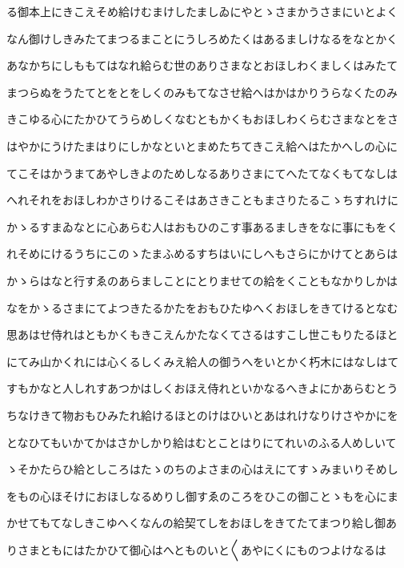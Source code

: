 \documentclass[a4paper,11pt,landscape]{ltjtarticle}
\begin{document}
る御本上にきこえそめ給けむまけしたましゐにやとゝさまかうさまにいとよく
\par\medskip
なん御けしきみたてまつるまことにうしろめたくはあるましけなるをなとかく
\par\medskip
あなかちにしももてはなれ給らむ世のありさまなとおほしわくましくはみたて
\par\medskip
まつらぬをうたてとをとをしくのみもてなさせ給へはかはかりうらなくたのみ
\par\medskip
きこゆる心にたかひてうらめしくなむともかくもおほしわくらむさまなとをさ
\par\medskip
はやかにうけたまはりにしかなといとまめたちてきこえ給へはたかへしの心に
\par\medskip
てこそはかうまてあやしきよのためしなるありさまにてへたてなくもてなしは
\par\medskip
へれそれをおほしわかさりけるこそはあさきこともまさりたるこゝちすれけに
\par\medskip
かゝるすまゐなとに心あらむ人はおもひのこす事あるましきをなに事にもをく
\par\medskip
れそめにけるうちにこのゝたまふめるすちはいにしへもさらにかけてとあらは
\par\medskip
かゝらはなと行すゑのあらましことにとりませての給をくこともなかりしかは
\par\medskip
なをかゝるさまにてよつきたるかたをおもひたゆへくおほしをきてけるとなむ
\par\medskip
思あはせ侍れはともかくもきこえんかたなくてさるはすこし世こもりたるほと
\par\medskip
にてみ山かくれには心くるしくみえ給人の御うへをいとかく朽木にはなしはて
\par\medskip
すもかなと人しれすあつかはしくおほえ侍れといかなるへきよにかあらむとう
\par\medskip
ちなけきて物おもひみたれ給けるほとのけはひいとあはれけなりけさやかにを
\par\medskip
となひてもいかてかはさかしかり給はむとことはりにてれいのふる人めしいて
\par\medskip
ゝそかたらひ給としころはたゝのちのよさまの心はえにてすゝみまいりそめし
\par\medskip
をもの心ほそけにおほしなるめりし御すゑのころをひこの御ことゝもを心にま
\par\medskip
かせてもてなしきこゆへくなんの給契てしをおほしをきてたてまつり給し御あ
\par\medskip
りさまともにはたかひて御心はへとものいと〱あやにくにものつよけなるは
\par\medskip
\end{document}
